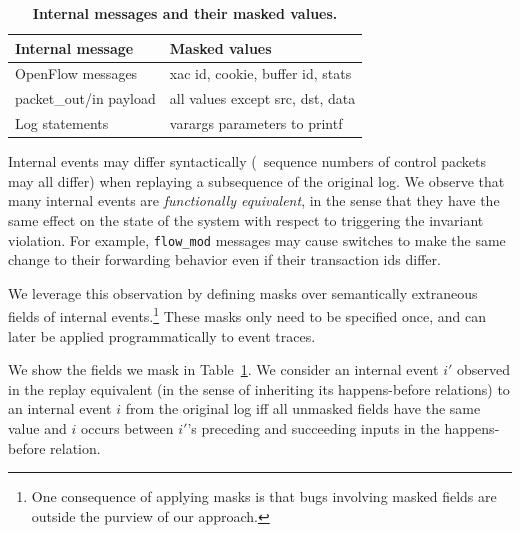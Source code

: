 \begin{table}[tb]
\centering
\footnotesize
\begin{tabular}{|l|l|}
\hline
{\bf Internal message} & {\bf Masked values} \\
\hline
\hline
OpenFlow messages & xac id, cookie, buffer id, stats \\
\hline
packet\_out/in payload & all values except src, dst, data \\
\hline
Log statements & varargs parameters to printf \\
\hline
\end{tabular}
\caption{\textbf{Internal messages and their masked values.}%
}
\label{tab:fingerprints}
\vspace{-0.3cm}
\end{table}

 Internal events may differ syntactically (\eg~sequence numbers
of control packets may all differ) when replaying a subsequence of the original log.
We observe that many internal events are {\em functionally
equivalent}, in the sense that they
have the same effect on the state of the system with respect to triggering the
invariant violation. For example,
\verb=flow_mod=
messages may cause switches to make the same change to their forwarding behavior
even if their transaction ids differ.

We leverage this observation by defining
masks over semantically extraneous fields of
internal events.\footnote{One consequence
of applying masks is that bugs involving masked fields are outside the purview of
our approach.} These masks only need to be specified once, and can later be
applied programmatically to event traces.

We show the fields we mask in Table~\ref{tab:fingerprints}. We consider an
internal event $i'$ observed in the replay
equivalent (in the sense of inheriting its happens-before relations) to an internal
event $i$ from the original log iff all unmasked fields have the same value
and $i$ occurs between $i'$'s preceding and succeeding inputs in the
happens-before relation.

